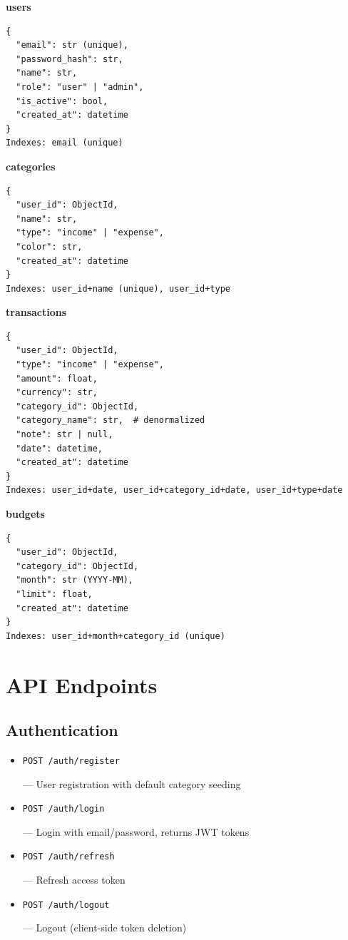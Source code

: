 \documentclass[11pt,a4paper]{article}
\newcommand{\code}[1]{\colorbox{codebg}{\strut\texttt{\small #1}}}
\begin{document}
\textbf{users}
\begin{lstlisting}[style=python]
{
  "email": str (unique),
  "password_hash": str,
  "name": str,
  "role": "user" | "admin",
  "is_active": bool,
  "created_at": datetime
}
Indexes: email (unique)
\end{lstlisting}

\textbf{categories}
\begin{lstlisting}[style=python]
{
  "user_id": ObjectId,
  "name": str,
  "type": "income" | "expense",
  "color": str,
  "created_at": datetime
}
Indexes: user_id+name (unique), user_id+type
\end{lstlisting}

\textbf{transactions}
\begin{lstlisting}[style=python]
{
  "user_id": ObjectId,
  "type": "income" | "expense",
  "amount": float,
  "currency": str,
  "category_id": ObjectId,
  "category_name": str,  # denormalized
  "note": str | null,
  "date": datetime,
  "created_at": datetime
}
Indexes: user_id+date, user_id+category_id+date, user_id+type+date
\end{lstlisting}

\textbf{budgets}
\begin{lstlisting}[style=python]
{
  "user_id": ObjectId,
  "category_id": ObjectId,
  "month": str (YYYY-MM),
  "limit": float,
  "created_at": datetime
}
Indexes: user_id+month+category_id (unique)
\end{lstlisting}

\section{API Endpoints}

\subsection{Authentication}
\begin{itemize}[leftmargin=*,itemsep=1pt]
  \item \code{POST /auth/register} --- User registration with default category seeding
  \item \code{POST /auth/login} --- Login with email/password, returns JWT tokens
  \item \code{POST /auth/refresh} --- Refresh access token
  \item \code{POST /auth/logout} --- Logout (client-side token deletion)
\end{itemize}
\end{document}
